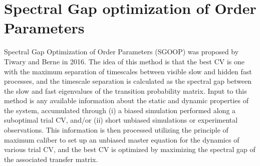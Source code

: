 \section{Spectral Gap optimization of Order Parameters\label{Sec:DR:SGOOP}}
Spectral Gap Optimization of Order Parameters (SGOOP) was proposed by Tiwary and Berne in 2016.\cite{TiwaryPNAS2016} The idea of this method is that the best CV is one with the maximum separation of timescales between visible slow and hidden fast processes, and the timescale separation is calculated as the spectral gap between the slow and fast eigenvalues of the transition probability matrix. Input to this method is any available information about the static and dynamic properties of the system, accumulated through (i) a biased simulation performed along a suboptimal trial CV, and/or (ii) short unbiased simulations or experimental observations. This information is then processed utilizing the principle of maximum caliber to set up an unbiased master equation for the dynamics of various trial CV, and the best CV is optimized by maximizing the spectral gap of the associated transfer matrix.

